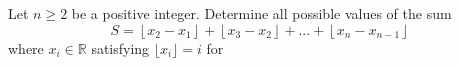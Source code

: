 Let $n\geq2$ be a positive integer. Determine all possible values of the sum
\[ S=\left\lfloor x_{2}-x_{1}\right\rfloor +\left\lfloor x_{3}-x_{2}\right\rfloor+...+\left\lfloor x_{n}-x_{n-1}\right\rfloor \]
where $x_i\in \mathbb{R}$ satisfying $\lfloor{x_i}\rfloor=i$ for 